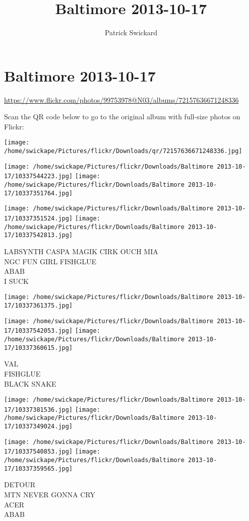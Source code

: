 \documentclass[10pt,letterpaper]{article}
\title{Baltimore 2013-10-17}
\author{Patrick Swickard}
\date{}
\begin{document}
\section*{Baltimore 2013-10-17}

\url{https://www.flickr.com/photos/99753978@N03/albums/72157636671248336}

Scan the QR code below to go to the original album with full-size photos on Flickr:

\texttt{[image: /home/swickape/Pictures/flickr/Downloads/qr/72157636671248336.jpg]}
\pagebreak

\texttt{[image: /home/swickape/Pictures/flickr/Downloads/Baltimore 2013-10-17/10337544223.jpg]}
\texttt{[image: /home/swickape/Pictures/flickr/Downloads/Baltimore 2013-10-17/10337351764.jpg]}

\texttt{[image: /home/swickape/Pictures/flickr/Downloads/Baltimore 2013-10-17/10337351524.jpg]}
\texttt{[image: /home/swickape/Pictures/flickr/Downloads/Baltimore 2013-10-17/10337542813.jpg]}

LABSYNTH CASPA MAGIK CIRK OUCH MIA\\
NGC FUN GIRL FISHGLUE\\
ABAB\\
I SUCK
\pagebreak

\texttt{[image: /home/swickape/Pictures/flickr/Downloads/Baltimore 2013-10-17/10337361375.jpg]}

\vspace{0.25in}
\texttt{[image: /home/swickape/Pictures/flickr/Downloads/Baltimore 2013-10-17/10337542053.jpg]}
\texttt{[image: /home/swickape/Pictures/flickr/Downloads/Baltimore 2013-10-17/10337360615.jpg]}

VAL\\
FISHGLUE\\
BLACK SNAKE
\pagebreak

\texttt{[image: /home/swickape/Pictures/flickr/Downloads/Baltimore 2013-10-17/10337381536.jpg]}
\texttt{[image: /home/swickape/Pictures/flickr/Downloads/Baltimore 2013-10-17/10337349024.jpg]}

\texttt{[image: /home/swickape/Pictures/flickr/Downloads/Baltimore 2013-10-17/10337540853.jpg]}
\texttt{[image: /home/swickape/Pictures/flickr/Downloads/Baltimore 2013-10-17/10337359565.jpg]}

DETOUR\\
MTN NEVER GONNA CRY\\
ACER\\
ABAB
\pagebreak
\end{document}
